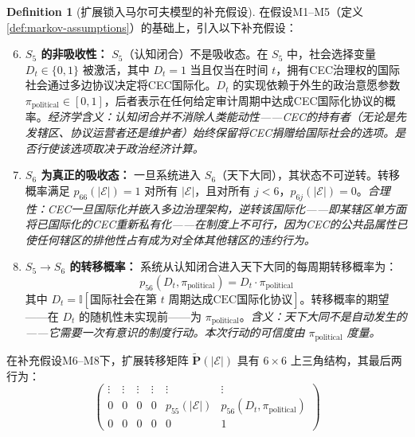 \documentclass[12pt,a4paper]{ctexart}
\theoremstyle{definition}
\newtheorem{definition}{Definition}[section]
\theoremstyle{remark}
\begin{document}
\begin{definition}[扩展锁入马尔可夫模型的补充假设]
\label{def:markov-assumptions-extended}
在假设M1--M5（定义\ref{def:markov-assumptions}）的基础上，引入以下补充假设：

\begin{enumerate}[label=\textbf{M\arabic*}, leftmargin=*, itemsep=4pt]
\setcounter{enumi}{5}
\item \textbf{$S_5$ 的非吸收性：} $S_5$（认知闭合）不是吸收态。在 $S_5$ 中，社会选择变量 $D_t \in \{0, 1\}$ 被激活，其中 $D_t = 1$ 当且仅当在时间 $t$，拥有CEC治理权的国际社会通过多边协议决定将CEC国际化。$D_t$ 的实现依赖于外生的政治意愿参数 $\pi_{\text{political}} \in [0, 1]$，后者表示在任何给定审计周期中达成CEC国际化协议的概率。\hfill\textit{经济学含义：认知闭合并不消除人类能动性——CEC的持有者（无论是先发辖区、协议运营者还是维护者）始终保留将CEC捐赠给国际社会的选项。是否行使该选项取决于政治经济计算。}

\item \textbf{$S_6$ 为真正的吸收态：} 一旦系统进入 $S_6$（天下大同），其状态不可逆转。转移概率满足 $p_{66}(|\mathcal{E}|) = 1$ 对所有 $|\mathcal{E}|$，且对所有 $j < 6$，$p_{6j}(|\mathcal{E}|) = 0$。\hfill\textit{合理性：CEC一旦国际化并嵌入多边治理架构，逆转该国际化——即某辖区单方面将已国际化的CEC重新私有化——在制度上不可行，因为CEC的公共品属性已使任何辖区的排他性占有成为对全体其他辖区的违约行为。}

\item \textbf{$S_5 \to S_6$ 的转移概率：} 系统从认知闭合进入天下大同的每周期转移概率为：
\begin{equation}
p_{56}(D_t, \pi_{\text{political}}) = D_t \cdot \pi_{\text{political}}
\end{equation}
其中 $D_t = \mathbb{I}[\text{国际社会在第 }t\text{ 周期达成CEC国际化协议}]$。转移概率的期望——在 $D_t$ 的随机性未实现前——为 $\pi_{\text{political}}$。\hfill\textit{含义：天下大同不是自动发生的——它需要一次有意识的制度行动。本次行动的可信度由 $\pi_{\text{political}}$ 度量。}
\end{enumerate}
\end{definition}

在补充假设M6--M8下，扩展转移矩阵 $\tilde{\mathbf{P}}(|\mathcal{E}|)$ 具有 $6 \times 6$ 上三角结构，其最后两行为：
\begin{equation}
\begin{pmatrix}
\vdots & \vdots & \vdots & \vdots & \vdots & \vdots \\
0 & 0 & 0 & 0 & p_{55}(|\mathcal{E}|) & p_{56}(D_t, \pi_{\text{political}}) \\
0 & 0 & 0 & 0 & 0 & 1
\end{pmatrix}
\end{equation}
\end{document}

